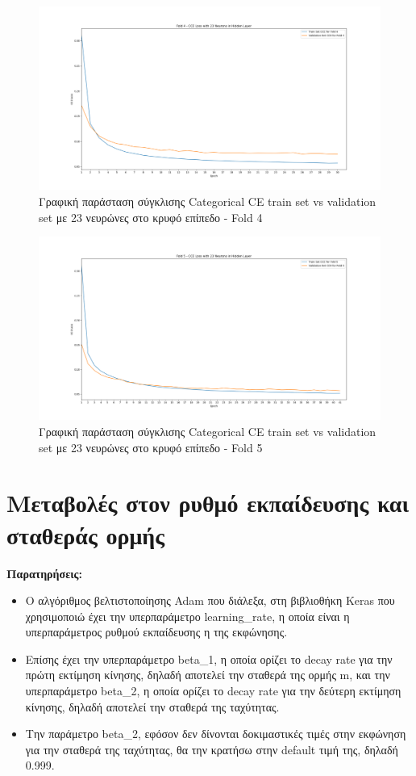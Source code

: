 \documentclass[12pt,a4paper]{article}
\begin{document}
\begin{figure}[H]
	\includegraphics[width=\textwidth]{Screenshots/22. Train vs Validation Fold 4.png}
	\caption{Γραφική παράσταση σύγκλισης Categorical CE train set vs validation set με 23 νευρώνες στο κρυφό επίπεδο - Fold 4}
\end{figure}

\begin{figure}[H]
	\includegraphics[width=\textwidth]{Screenshots/23. Train vs Validation Fold 5.png}
	\caption{Γραφική παράσταση σύγκλισης Categorical CE train set vs validation set με 23 νευρώνες στο κρυφό επίπεδο - Fold 5}
\end{figure}

\section{Μεταβολές στον ρυθμό εκπαίδευσης και σταθεράς ορμής}
\label{Μεταβολές στον ρυθμό εκπαίδευσης και σταθεράς ορμής}

\textbf{Παρατηρήσεις:}
\begin{itemize}
    \item Ο αλγόριθμος βελτιστοποίησης Adam που διάλεξα, στη βιβλιοθήκη Keras που χρησιμοποιώ έχει την υπερπαράμετρο learning\_rate, η οποία είναι η υπερπαράμετρος ρυθμού εκπαίδευσης η της εκφώνησης. 
    \item Επίσης έχει την υπερπαράμετρο beta\_1, η οποία ορίζει το decay rate για την πρώτη εκτίμηση κίνησης, δηλαδή αποτελεί την σταθερά της ορμής m, και την υπερπαράμετρο beta\_2, η οποία ορίζει το decay rate για την δεύτερη εκτίμηση κίνησης, δηλαδή αποτελεί την σταθερά της ταχύτητας. 
    \item Την παράμετρο beta\_2, εφόσον δεν δίνονται δοκιμαστικές τιμές στην εκφώνηση για την σταθερά της ταχύτητας, θα την κρατήσω στην default τιμή της, δηλαδή 0.999.
\end{itemize}
\end{document}
